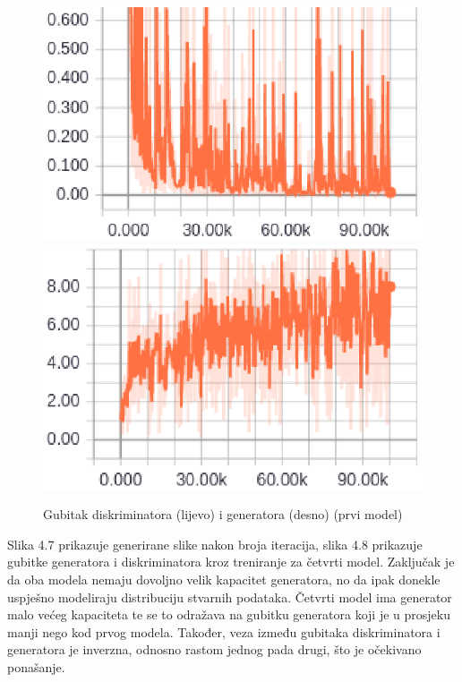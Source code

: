 \documentclass[times, utf8, diplomski]{fer}
\begin{document}
\begin{figure}[H]
\begin{center}
\includegraphics[width=.4\textwidth]{dcgandiscmini}
\includegraphics[width=.4\textwidth]{dcgangenmini}
\end{center}
\caption{Gubitak diskriminatora (lijevo) i generatora (desno) (prvi model)}
\end{figure}

Slika 4.7 prikazuje generirane slike nakon broja iteracija, slika 4.8 prikazuje gubitke generatora i diskriminatora kroz treniranje za četvrti model. Zaključak je da oba modela nemaju dovoljno velik kapacitet generatora, no da ipak donekle uspješno modeliraju distribuciju stvarnih podataka. Četvrti model ima generator malo većeg kapaciteta te se to odražava na gubitku generatora koji je u prosjeku manji nego kod prvog modela. Također, veza između gubitaka diskriminatora i generatora je inverzna, odnosno rastom jednog pada drugi, što je očekivano ponašanje.
\end{document}
